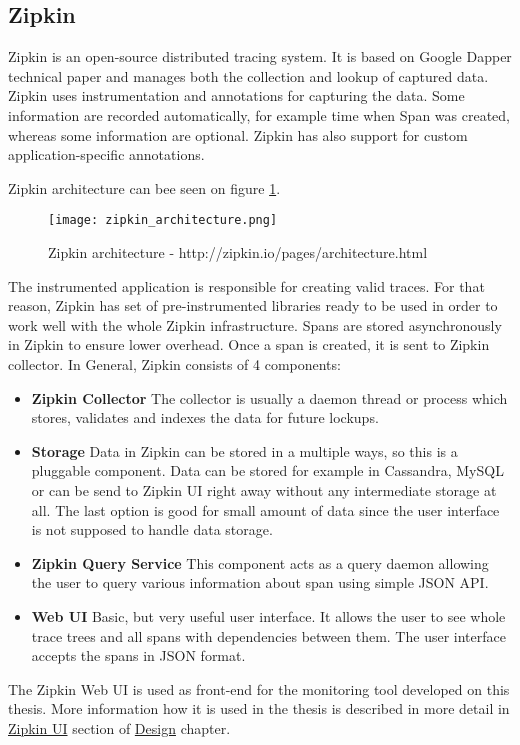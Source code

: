 \subsection{Zipkin}
\label{zipkin}
Zipkin is an open-source distributed tracing system. It is based on Google Dapper technical paper and manages both the collection and lookup of captured data. Zipkin uses instrumentation and annotations for capturing the data. Some
information are recorded automatically, for example time when Span was created, whereas some information are optional. Zipkin has also support for custom application-specific annotations.

Zipkin architecture can bee seen on figure \ref{fig:zipkin_architecture}.
\begin{figure}
	\centering
	\texttt{[image: zipkin\_architecture.png]}
	\caption{Zipkin architecture - http://zipkin.io/pages/architecture.html}
	\label{fig:zipkin_architecture}
\end{figure}
The instrumented application is responsible for creating valid traces. For that reason, Zipkin has set of pre-instrumented libraries ready to be used in order to work well with the whole Zipkin infrastructure. Spans are stored asynchronously in Zipkin to ensure lower overhead. Once a span is created, it is sent to Zipkin collector. In General, Zipkin consists of 4 components:
\begin{itemize}
	\item \textbf{Zipkin Collector} \newline
	The collector is usually a daemon thread or process which stores, validates and indexes the data for future lockups.
	\item\textbf{Storage} \newline
	Data in Zipkin can be stored in a multiple ways, so this is a pluggable component. Data can be stored for example in Cassandra, MySQL or can be send to Zipkin UI right away without any intermediate storage at all. The last option is good for small amount of data since the user interface is not supposed to handle data storage.
	\item \textbf{Zipkin Query Service} \newline
	This component acts as a query daemon allowing the user to query various information about span using simple JSON API.
	\item \textbf{Web UI} \newline
	Basic, but very useful user interface. It allows the user to see whole trace trees and all spans with dependencies between them. The user interface accepts the spans in JSON format.
\end{itemize}
The Zipkin Web UI is used as front-end for the monitoring tool developed on this thesis. More information how it is used in the thesis is described in more detail in \hyperref[sec:zipkin_ui]{Zipkin UI} section of \hyperref[chap:design]{Design} chapter.
